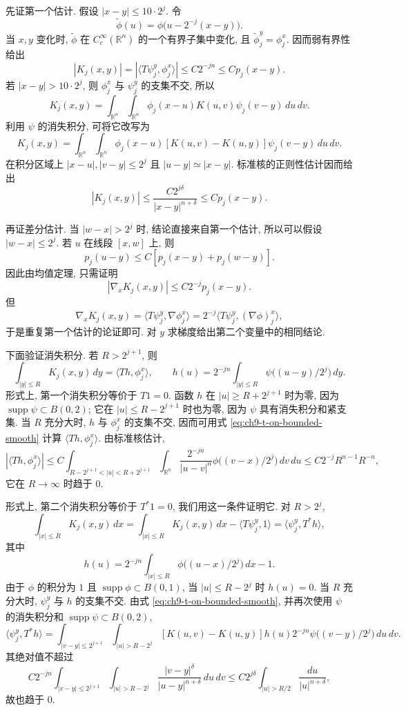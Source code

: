 \begin{Proof}
先证第一个估计. 假设 $|x-y|\leq10\cdot2^j$. 令
\[
 \widetilde\phi(u)=\phi\bigl(u-2^{-j}(x-y)\bigr).
\]
当 $x,y$ 变化时, $\widetilde\phi$ 在 $C_c^\infty(\mathbb R^n)$ 的一个有界子集中变化, 且 $\widetilde\phi_j^y=\phi_j^x$. 因而弱有界性给出
\[
 |K_j(x,y)|=|\langle T\psi_j^y,\phi_j^x\rangle|
 \leq C2^{-jn}\leq Cp_j(x-y).
\]
若 $|x-y|>10\cdot2^j$, 则 $\phi_j^x$ 与 $\psi_j^y$ 的支集不交, 所以
\[
 K_j(x,y)=\int_{\mathbb R^n}\int_{\mathbb R^n}
 \phi_j(x-u)K(u,v)\psi_j(v-y)\,du\,dv.
\]
利用 $\psi$ 的消失积分, 可将它改写为
\[
 K_j(x,y)=\int_{\mathbb R^n}\int_{\mathbb R^n}
 \phi_j(x-u)[K(u,v)-K(u,y)]\psi_j(v-y)\,du\,dv.
\]
在积分区域上 $|x-u|,|v-y|\leq2^j$ 且 $|u-y|\simeq|x-y|$. 标准核的正则性估计因而给出
\[
 |K_j(x,y)|\leq\frac{C2^{j\delta}}{|x-y|^{n+\delta}}
 \leq Cp_j(x-y).
\]

再证差分估计. 当 $|w-x|>2^j$ 时, 结论直接来自第一个估计, 所以可以假设 $|w-x|\leq2^j$. 若 $u$ 在线段 $[x,w]$ 上, 则
\[
 p_j(u-y)\leq C[p_j(x-y)+p_j(w-y)].
\]
因此由均值定理, 只需证明
\[
 |\nabla_xK_j(x,y)|\leq C2^{-j}p_j(x-y).
\]
但
\[
 \nabla_xK_j(x,y)=\langle T\psi_j^y,\nabla\phi_j^x\rangle
 =2^{-j}\langle T\psi_j^y,(\nabla\phi)_j^x\rangle,
\]
于是重复第一个估计的论证即可. 对 $y$ 求梯度给出第二个变量中的相同结论.

下面验证消失积分. 若 $R>2^{j+1}$, 则
\[
 \int_{|y|\leq R}K_j(x,y)\,dy=\langle Th,\phi_j^x\rangle,
 \qquad
 h(u)=2^{-jn}\int_{|y|\leq R}\psi\bigl((u-y)/2^j\bigr)\,dy.
\]
形式上, 第一个消失积分等价于 $T1=0$. 函数 $h$ 在 $|u|\geq R+2^{j+1}$ 时为零, 因为 $\operatorname{supp}\psi\subset B(0,2)$; 它在 $|u|\leq R-2^{j+1}$ 时也为零, 因为 $\psi$ 具有消失积分和紧支集. 当 $R$ 充分大时, $h$ 与 $\phi_j^x$ 的支集不交, 因而可用式 \eqref{eq:ch9-t-on-bounded-smooth} 计算 $\langle Th,\phi_j^x\rangle$. 由标准核估计,
\[
 |\langle Th,\phi_j^x\rangle|
 \leq C\int_{R-2^{j+1}<|u|<R+2^{j+1}}\int_{\mathbb R^n}
 \frac{2^{-jn}}{|u-v|^n}\phi\bigl((v-x)/2^j\bigr)\,dv\,du
 \leq C2^{-j}R^{n-1}R^{-n},
\]
它在 $R\to\infty$ 时趋于 $0$.

形式上, 第二个消失积分等价于 $T^*1=0$, 我们用这一条件证明它. 对 $R>2^j$,
\[
 \int_{|x|\leq R}K_j(x,y)\,dx
 =\int_{|x|\leq R}K_j(x,y)\,dx-\langle T\psi_j^y,1\rangle
 =\langle\psi_j^y,T^*h\rangle,
\]
其中
\[
 h(u)=2^{-jn}\int_{|x|\leq R}\phi\bigl((u-x)/2^j\bigr)\,dx-1.
\]
由于 $\phi$ 的积分为 $1$ 且 $\operatorname{supp}\phi\subset B(0,1)$, 当 $|u|\leq R-2^j$ 时 $h(u)=0$. 当 $R$ 充分大时, $\psi_j^y$ 与 $h$ 的支集不交. 由式 \eqref{eq:ch9-t-on-bounded-smooth}, 并再次使用 $\psi$ 的消失积分和 $\operatorname{supp}\psi\subset B(0,2)$,
\[
 \langle\psi_j^y,T^*h\rangle
 =\int_{|v-y|\leq2^{j+1}}\int_{|u|>R-2^j}
 [K(u,v)-K(u,y)]h(u)2^{-jn}\psi\bigl((v-y)/2^j\bigr)\,du\,dv.
\]
其绝对值不超过
\[
 C2^{-jn}\int_{|v-y|\leq2^{j+1}}\int_{|u|>R-2^j}
 \frac{|v-y|^\delta}{|u-y|^{n+\delta}}\,du\,dv
 \leq C2^{j\delta}\int_{|u|>R/2}\frac{du}{|u|^{n+\delta}},
\]
故也趋于 $0$.
\end{Proof}

